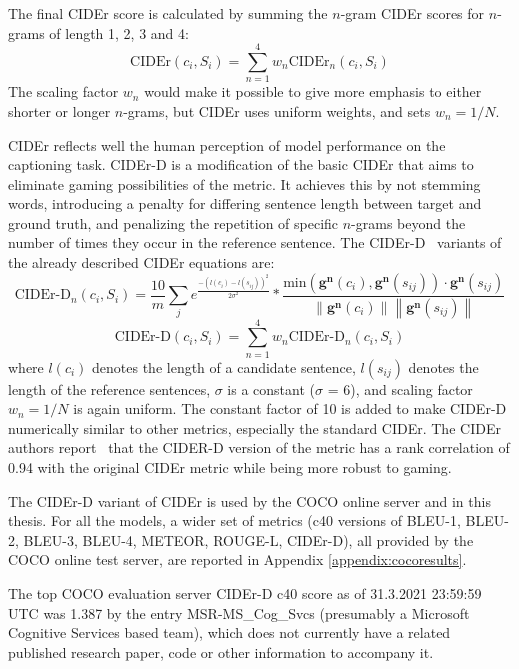 \documentclass[english,twoside,openright]{HYgraduMLDS}
\newcommand{\vect}[1]{\bm{#1}}
\begin{document}
The final CIDEr score is calculated by summing the $n$-gram CIDEr scores for $n$-grams of length 1, 2, 3 and 4:
\begin{equation}
\text{CIDEr}(c_i, S_i) = \sum_{n=1}^4 w_n \text{CIDEr}_n(c_i, S_i)
\end{equation}
%
The scaling factor $w_n$ would make it possible to give more emphasis to either shorter or longer $n$-grams, but CIDEr uses uniform weights, and sets $w_n = 1 / N$.

CIDEr reflects well the human perception of model performance on the captioning task. CIDEr-D is a modification of the basic CIDEr that aims to eliminate gaming possibilities of the metric. It achieves this by not stemming words, introducing a penalty for differing sentence length between target and ground truth, and penalizing the repetition of specific $n$-grams beyond the number of times they occur in the reference sentence. The CIDEr-D~\cite{CIDEr} variants of the already described CIDEr equations are:
\begin{equation}
\text{CIDEr-D}_n(c_i, S_i) = \frac{10}{m} \sum_j e^{\frac{- (l(c_i)-l(s_{ij}))^2}{2\sigma^2}} * \frac{\text{min} ( \vect{g^n}(c_i), \vect{g^n}(s_{ij})) \cdot \vect{g^n}(s_{ij})}{\left\lVert \vect{g^n}(c_i) \right\rVert \left\lVert \vect{g^n}(s_{ij}) \right\rVert}
\end{equation}
\begin{equation}
\text{CIDEr-D}(c_i, S_i) = \sum_{n=1}^4 w_n \text{CIDEr-D}_n(c_i, S_i)
\end{equation}
%
where $l(c_i)$ denotes the length of a candidate sentence, $l(s_{ij})$ denotes the length of the reference sentences, $\sigma$ is a constant ($\sigma$ = 6), and scaling factor $w_n = 1 / N$ is again uniform. The constant factor of 10 is added to make CIDEr-D numerically similar to other metrics, especially the standard CIDEr. The CIDEr authors report~\cite{CIDEr} that the CIDER-D version of the metric has a rank correlation of 0.94 with the original CIDEr metric while being more robust to gaming.

The CIDEr-D variant of CIDEr is used by the COCO online server and in this thesis. For all the models, a wider set of metrics (c40 versions of BLEU-1, BLEU-2, BLEU-3, BLEU-4, METEOR, ROUGE-L, CIDEr-D), all provided by the COCO online test server, are reported in Appendix \ref{appendix:cocoresults}. 

The top COCO evaluation server CIDEr-D c40 score as of 31.3.2021 23:59:59 UTC was 1.387 by the entry MSR-MS\_Cog\_Svcs (presumably a Microsoft Cognitive Services based team), which does not currently have a related published research paper, code or other information to accompany it.
\end{document}
